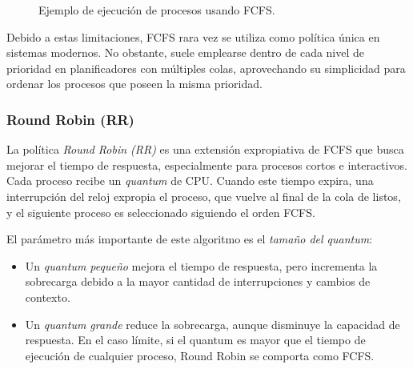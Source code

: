 \begin{figure}[!ht]
  \centering
  \caption{Ejemplo de ejecución de procesos usando FCFS.}
\end{figure}

Debido a estas limitaciones, FCFS rara vez se utiliza como política única en sistemas modernos. No obstante, suele emplearse dentro de cada nivel de prioridad en planificadores con múltiples colas, aprovechando su simplicidad para ordenar los procesos que poseen la misma prioridad.

\subsubsection{Round Robin (RR)}

La política \textit{Round Robin (RR)} es una extensión expropiativa de FCFS que busca mejorar el tiempo de respuesta, especialmente para procesos cortos e interactivos. Cada proceso recibe un \textit{quantum} de CPU. Cuando este tiempo expira, una interrupción del reloj expropia el proceso, que vuelve al final de la cola de listos, y el siguiente proceso es seleccionado siguiendo el orden FCFS.

El parámetro más importante de este algoritmo es el \textit{tamaño del quantum}:
\begin{itemize}
  \item Un \textit{quantum pequeño} mejora el tiempo de respuesta, pero incrementa la sobrecarga debido a la mayor cantidad de interrupciones y cambios de contexto.
  \item Un \textit{quantum grande} reduce la sobrecarga, aunque disminuye la capacidad de respuesta. En el caso límite, si el quantum es mayor que el tiempo de ejecución de cualquier proceso, Round Robin se comporta como FCFS.
\end{itemize}

